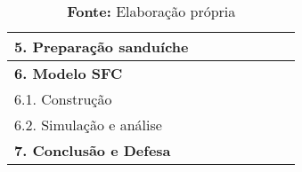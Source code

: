 \begin{table}[H]
{\begin{tabular}{ll|l|l|l|l|ll}
\textbf{5. Preparação sanduíche}\footnotemark &&&&\cellcolor[HTML]{9B9B9B}&\cellcolor[HTML]{9B9B9B}& \\ \hline

\textbf{6. Modelo SFC} &&&\cellcolor[HTML]{FF0000}&\cellcolor[HTML]{FF0000}&\cellcolor[HTML]{FF0000}&\cellcolor[HTML]{FF0000} \\ \hline
6.1. Construção &&&\cellcolor[HTML]{FF9933}&\cellcolor[HTML]{FF9933}&& \\ \hline
6.2. Simulação e análise &&&&&\cellcolor[HTML]{FF9933}&\cellcolor[HTML]{FF9933}\\ \hline

\textbf{7. Conclusão e Defesa} & & &  &  & & \cellcolor[HTML]{9B9B9B} \\ \hline \hline
		
	

\end{tabular}%
	\renewcommand{\arraystretch}{0.4}
	}
\caption*{\textbf{Fonte:} Elaboração própria}
\end{table}




\begin{comment}

\end{comment}




